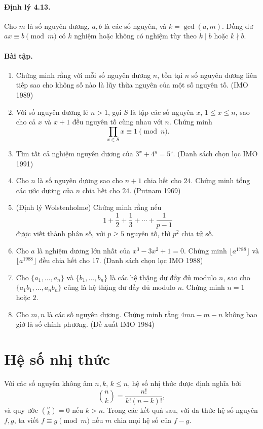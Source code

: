 \documentclass[11pt]{article}
\begin{document}
\paragraph{Định lý 4.13.}
Cho \(m\) là số nguyên dương, \(a,b\) là các số nguyên, và
\(k=\gcd(a,m)\). Đồng dư \(ax\equiv b\pmod m\) có \(k\) nghiệm hoặc không có
nghiệm tùy theo \(k\mid b\) hoặc \(k\nmid b\).

\paragraph{Bài tập.}
\begin{enumerate}
\item Chứng minh rằng với mỗi số nguyên dương \(n\), tồn tại \(n\) số nguyên
dương liên tiếp sao cho không số nào là lũy thừa nguyên của một số nguyên tố.
(IMO 1989)
\item Với số nguyên dương lẻ \(n>1\), gọi \(S\) là tập các số nguyên \(x\),
\(1\le x\le n\), sao cho cả \(x\) và \(x+1\) đều nguyên tố cùng nhau với \(n\).
Chứng minh
\[
 \prod_{x\in S}x\equiv1\pmod n.
\]
\item Tìm tất cả nghiệm nguyên dương của \(3^x+4^y=5^z\). (Danh sách chọn lọc
IMO 1991)
\item Cho \(n\) là số nguyên dương sao cho \(n+1\) chia hết cho \(24\). Chứng
minh tổng các ước dương của \(n\) chia hết cho \(24\). (Putnam 1969)
\item (Định lý Wolstenholme) Chứng minh rằng nếu
\[
 1+\frac12+\frac13+\cdots+\frac1{p-1}
\]
được viết thành phân số, với \(p\ge5\) nguyên tố, thì \(p^2\) chia tử số.
\item Cho \(a\) là nghiệm dương lớn nhất của \(x^3-3x^2+1=0\). Chứng minh
\(\lfloor a^{1788}\rfloor\) và \(\lfloor a^{1988}\rfloor\) đều chia hết cho
\(17\). (Danh sách chọn lọc IMO 1988)
\item Cho \(\{a_1,\ldots,a_n\}\) và \(\{b_1,\ldots,b_n\}\) là các hệ thặng dư
đầy đủ modulo \(n\), sao cho \(\{a_1b_1,\ldots,a_nb_n\}\) cũng là hệ thặng dư
đầy đủ modulo \(n\). Chứng minh \(n=1\) hoặc \(2\).
\item Cho \(m,n\) là các số nguyên dương. Chứng minh rằng \(4mn-m-n\) không
bao giờ là số chính phương. (Đề xuất IMO 1984)
\end{enumerate}

\section{Hệ số nhị thức}

Với các số nguyên không âm \(n,k\), \(k\le n\), hệ số nhị thức được định nghĩa
bởi
\[
 \binom nk=\frac{n!}{k!(n-k)!},
\]
và quy ước \(\binom nk=0\) nếu \(k>n\). Trong các kết quả sau, với đa thức hệ
số nguyên \(f,g\), ta viết \(f\equiv g\pmod m\) nếu \(m\) chia mọi hệ số của
\(f-g\).
\end{document}
